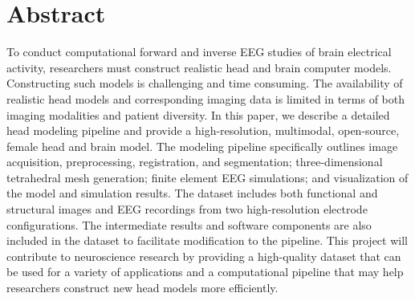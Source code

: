 %

\section*{Abstract}

To conduct computational forward and inverse EEG studies of brain electrical activity, researchers must construct realistic head and brain computer models. Constructing such models is challenging and time consuming. The availability of realistic head models and corresponding imaging data is limited in terms of both imaging modalities and patient diversity. In this paper, we describe a detailed head modeling pipeline and provide a high-resolution, multimodal, open-source, female head and brain model. The modeling pipeline specifically outlines image acquisition, preprocessing, registration, and segmentation; three-dimensional tetrahedral mesh generation; finite element EEG simulations; and visualization of the model and simulation results. The dataset includes both functional and structural images and EEG recordings from two high-resolution electrode configurations. The intermediate results and software components are also included in the dataset to facilitate modification to the pipeline. This project will contribute to neuroscience research by providing a high-quality dataset that can be used for a variety of applications and a computational pipeline that may help researchers construct new head models more efficiently.